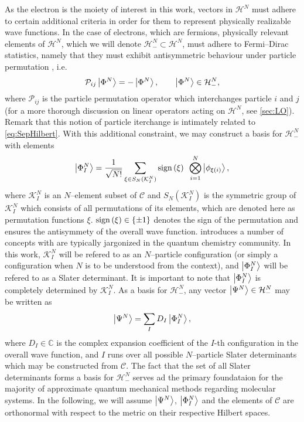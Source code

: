 As the electron is the moiety of interest in this work, vectors in $\mathcal{H}^N$ must adhere to certain additional 
criteria in order for them to represent physically realizable wave functions. In the case of electrons, which are 
fermions, physically relevant elements of $\mathcal{H}^N$, which we will denote $\mathcal{H}^N_- \subset \mathcal{H}^N$, must 
adhere to Fermi--Dirac statistics, namely that they must exhibit antisymmetric behaviour under particle permutation
\cite{Walecka12_book,Schuck04_book}, i.e.
\begin{equation}
  \label{eq:FermiDirac}
  \mathcal{P}_{ij} \left\vert \Phi^N \right\rangle = -\left\vert \Phi^N \right\rangle, \qquad \left\vert \Phi^N \right\rangle \in \mathcal{H}^N_-,
\end{equation} 
where $\mathcal{P}_{ij}$ is the particle permutation operator which interchanges particle $i$ and $j$ 
(for a more thorough discussion on linear operators acting on $\mathcal{H}^N$, see \cref{sec:LO}). Remark
that this notion of particle iterchange is intimately related to \cref{eq:SepHilbert}. With this additional
constraint, we may construct a basis for $\mathcal{H}^N_-$ with elements
\begin{equation}
  \label{eq:SlaterDet}
  \left\vert \Phi^N_I \right\rangle = \frac{1}{\sqrt{N!}} \sum_{\xi \in S_N(\mathcal{K}^N_I)} \mathrm{sign}\left( \xi \right) \text{ } \bigotimes_{i = 1 }^N \left\vert \phi_{\xi(i)} \right\rangle,
\end{equation}
where $\mathcal{K}_I^N$ is an $N$--element subset of $\mathcal{C}$ and $S_N(\mathcal{K}_I^N)$ is the symmetric group
of $\mathcal{K}_I^N$ which consists of all permutations of its elements, which are denoted here as permutation
functions $\xi$. $\mathrm{sign}\left( \xi \right) \in \{ \pm 1 \}$ denotes the sign of the permutation and ensures the antisymmety of
the overall wave function.  introduces a number of concepts with are typically jargonized 
in the quantum chemistry community. In this work, $\mathcal{K}_I^N$ will be refered to as an $N$--particle
configuration (or simply a configuration when $N$ is to be understood from the context), and $\left\vert \Phi^N_I \right\rangle$
will be refered to as a Slater determinant. It is important to note that $\left\vert \Phi^N_I \right\rangle$ is completely 
determined by $\mathcal{K}_I^N$. As a basis for $\mathcal{H}^N_-$, any vector $\left\vert \Psi^N \right\rangle \in \mathcal{H}^N_-$
may be written as \cite{Ostlund12_book}
\begin{equation}
\left\vert \Psi^N \right\rangle = \sum_I D_I \left\vert \Phi^N_I \right\rangle,
\end{equation}
where $D_I\in\mathbb C$ is the complex expansion coefficient of the $I$-th configuration in the overall wave function,
and $I$ runs over all possible $N$--particle Slater determinants which may be constructed from $\mathcal{C}$.
The fact that the set of all Slater determinants forms a basis for $\mathcal{H}^N_-$
serves ad the primary foundataion for the majority of approximate quantum mechanical methods regarding molecular
systems. In the following, we will assume $\left\vert \Psi^N \right\rangle$, $\left\vert \Phi^N_I \right\rangle$ and the elements of $\mathcal{C}$ are orthonormal
with respect to the metric on their respective Hilbert spaces.

